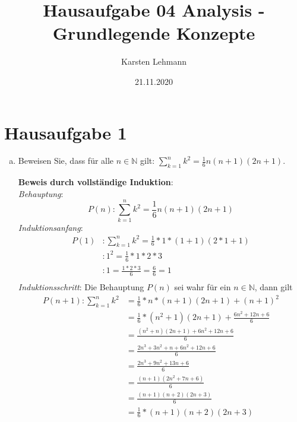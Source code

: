 \documentclass{article}
\author{Karsten Lehmann}
\date{21.11.2020}
\title{Hausaufgabe 04 Analysis - Grundlegende Konzepte}
\begin{document}
\maketitle
\newpage

\section*{Hausaufgabe 1}

\begin{enumerate}[a)]
\item Beweisen Sie, dass für alle $n \in \mathbb{N}$ gilt:
  $\sum\limits_{k = 1}^n k^2 = \frac{1}{6} n (n + 1) (2n + 1)$.

  \textbf{Beweis durch vollständige Induktion}: \\
  \emph{Behauptung}:
  \[
    P(n) \colon \sum\limits_{k = 1}^n k^2 = \frac{1}{6} n (n + 1) (2n + 1)
  \]
  \emph{Induktionsanfang}: 
  \begin{align*}
    P(1) &\colon \sum\limits_{k = 1}^n k^2 = \frac{1}{6} * 1 * (1 + 1) (2 * 1 + 1) \\
         &\colon 1^2 = \frac{1}{6} * 1 * 2 * 3 \\
         &\colon 1 = \frac{1 * 2 * 3}{6} = \frac{6}{6} = 1 \\
  \end{align*}
  \emph{Induktionsschritt}: Die Behauptung $P(n)$ sei wahr für ein $n \in \mathbb{N}$,
  dann gilt \\
  \begin{align*}
    P(n + 1) \colon \sum\limits_{k = 1}^n k^2 &= \frac{1}{6} * n * (n + 1) (2n + 1) + (n + 1)^2 \\
                                              &= \frac{1}{6} * (n^2 + 1) (2n + 1) + \frac{6n^2 + 12n + 6}{6} \\
                                              &= \frac{(n^2 + n) (2n + 1) + 6n^2 + 12n + 6}{6} \\
                                              &= \frac{2n^3  + 3n^2 + n + 6n^2 + 12n + 6}{6} \\
                                              &= \frac{2n^3 + 9n^2 + 13n + 6}{6} \\
                                              &= \frac{(n + 1)(2n^2 + 7n + 6)}{6} \\
                                              &= \frac{(n + 1)(n + 2)(2n + 3)}{6} \\
                                              &= \frac{1}{6} * (n + 1) (n + 2) (2n + 3)\\
  \end{align*}


\end{enumerate}
\end{document}
